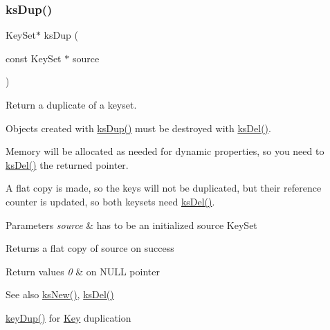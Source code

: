 \subsubsection{\texorpdfstring{ksDup()}{ksDup()}}
{\footnotesize\ttfamily Key\+Set$\ast$ ks\+Dup (\begin{DoxyParamCaption}\item[{const Key\+Set $\ast$}]{source }\end{DoxyParamCaption})}



Return a duplicate of a keyset. 

Objects created with \mbox{\hyperlink{group__keyset_gac59e4b328245463f1451f68d5106151c}{ks\+Dup()}} must be destroyed with \mbox{\hyperlink{group__keyset_ga27e5c16473b02a422238c8d970db7ac8}{ks\+Del()}}.

Memory will be allocated as needed for dynamic properties, so you need to \mbox{\hyperlink{group__keyset_ga27e5c16473b02a422238c8d970db7ac8}{ks\+Del()}} the returned pointer.

A flat copy is made, so the keys will not be duplicated, but their reference counter is updated, so both keysets need \mbox{\hyperlink{group__keyset_ga27e5c16473b02a422238c8d970db7ac8}{ks\+Del()}}.


\begin{DoxyParams}{Parameters}
{\em source} & has to be an initialized source Key\+Set \\
\hline
\end{DoxyParams}
\begin{DoxyReturn}{Returns}
a flat copy of source on success 
\end{DoxyReturn}

\begin{DoxyRetVals}{Return values}
{\em 0} & on N\+U\+LL pointer \\
\hline
\end{DoxyRetVals}
\begin{DoxySeeAlso}{See also}
\mbox{\hyperlink{group__keyset_ga671e1aaee3ae9dc13b4834a4ddbd2c3c}{ks\+New()}}, \mbox{\hyperlink{group__keyset_ga27e5c16473b02a422238c8d970db7ac8}{ks\+Del()}} 

\mbox{\hyperlink{group__key_gae6ec6a60cc4b8c1463fa08623d056ce3}{key\+Dup()}} for \mbox{\hyperlink{group__key}{Key}} duplication 
\end{DoxySeeAlso}
\mbox{\label{group__keyset_gaffe507ab9281c322eb16c3e992075d29}} 
